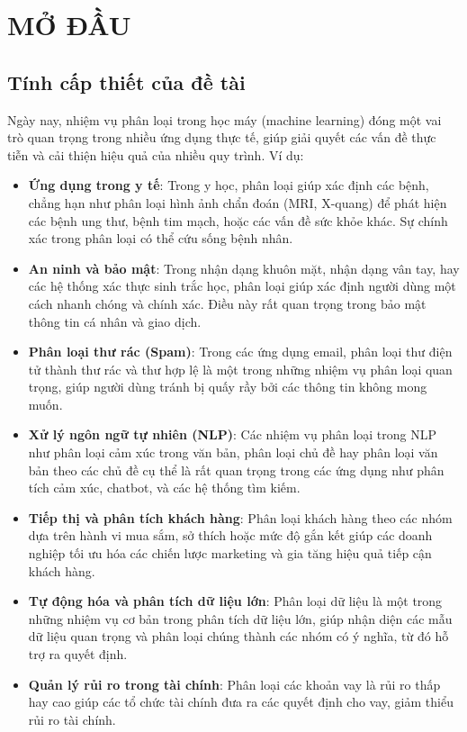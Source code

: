 \newpage
\chapter*{\Large MỞ ĐẦU}
\section*{Tính cấp thiết của đề tài}
Ngày nay, nhiệm vụ phân loại trong học máy (machine learning) đóng một vai trò quan trọng trong nhiều ứng dụng thực tế, giúp giải quyết các vấn đề thực tiễn và cải thiện hiệu quả của nhiều quy trình. Ví dụ:
\begin{itemize}
    \item \textbf{Ứng dụng trong y tế}: Trong y học, phân loại giúp xác định các bệnh, chẳng hạn như phân loại hình ảnh chẩn đoán (MRI, X-quang) để phát hiện các bệnh ung thư, bệnh tim mạch, hoặc các vấn đề sức khỏe khác. Sự chính xác trong phân loại có thể cứu sống bệnh nhân.
    \item \textbf{An ninh và bảo mật}: Trong nhận dạng khuôn mặt, nhận dạng vân tay, hay các hệ thống xác thực sinh trắc học, phân loại giúp xác định người dùng một cách nhanh chóng và chính xác. Điều này rất quan trọng trong bảo mật thông tin cá nhân và giao dịch.

    \item \textbf{Phân loại thư rác (Spam)}: Trong các ứng dụng email, phân loại thư điện tử thành thư rác và thư hợp lệ là một trong những nhiệm vụ phân loại quan trọng, giúp người dùng tránh bị quấy rầy bởi các thông tin không mong muốn.

    \item \textbf{Xử lý ngôn ngữ tự nhiên (NLP)}: Các nhiệm vụ phân loại trong NLP như phân loại cảm xúc trong văn bản, phân loại chủ đề hay phân loại văn bản theo các chủ đề cụ thể là rất quan trọng trong các ứng dụng như phân tích cảm xúc, chatbot, và các hệ thống tìm kiếm.

    \item \textbf{Tiếp thị và phân tích khách hàng}: Phân loại khách hàng theo các nhóm dựa trên hành vi mua sắm, sở thích hoặc mức độ gắn kết giúp các doanh nghiệp tối ưu hóa các chiến lược marketing và gia tăng hiệu quả tiếp cận khách hàng.

    \item \textbf{Tự động hóa và phân tích dữ liệu lớn}: Phân loại dữ liệu là một trong những nhiệm vụ cơ bản trong phân tích dữ liệu lớn, giúp nhận diện các mẫu dữ liệu quan trọng và phân loại chúng thành các nhóm có ý nghĩa, từ đó hỗ trợ ra quyết định.

    \item \textbf{Quản lý rủi ro trong tài chính}: Phân loại các khoản vay là rủi ro thấp hay cao giúp các tổ chức tài chính đưa ra các quyết định cho vay, giảm thiểu rủi ro tài chính.
\end{itemize}
